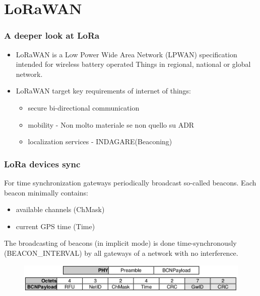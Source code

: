 \section{LoRaWAN}
  
\begin{frame}[fragile]
  \frametitle{A deeper look at LoRa}
  \begin{itemize}
      \item LoRaWAN is a Low Power Wide Area Network (LPWAN) specification intended for wireless battery operated Things in regional, national or global network. 
      \item LoRaWAN target key requirements of internet of things:
      \begin{itemize}
      	\item secure bi-directional communication
      	\item mobility - Non molto materiale se non quello su ADR
      	\item localization services - INDAGARE(Beaconing)
      \end{itemize}
  \end{itemize}
\end{frame}

\begin{frame}[fragile]
  \frametitle{LoRa devices sync}
  For time synchronization gateways periodically broadcast so-called beacons. Each beacon
  minimally contains:
  \begin{itemize}
      \item available channels (ChMask)
      \item current GPS time (Time)
      \end{itemize}
      The broadcasting of beacons (in implicit mode) is done time-synchronously (BEACON\_INTERVAL) by all gateways of a network with no interference.
      \begin{figure}
  \centering
  \includegraphics[width=\textwidth]{img/lora_beaconing.png}
  \end{figure}
\end{frame}

